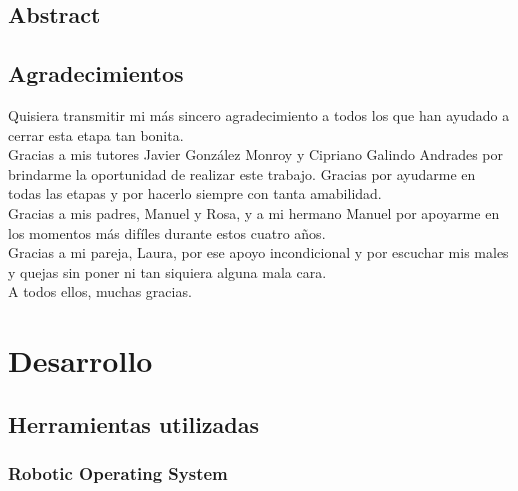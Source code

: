 \chapter*{Abstract}

\chapter*{Agradecimientos}

Quisiera transmitir mi más sincero agradecimiento a todos los que han ayudado a cerrar esta etapa tan bonita.\\

Gracias a mis tutores Javier González Monroy y Cipriano Galindo Andrades por brindarme la oportunidad de realizar este trabajo. Gracias por ayudarme en todas las etapas y por hacerlo siempre con tanta amabilidad.\\

Gracias a mis padres, Manuel y Rosa, y a mi hermano Manuel por apoyarme en los momentos más difíles durante estos cuatro años.\\

Gracias a mi pareja, Laura, por ese apoyo incondicional y por escuchar mis males y quejas sin poner ni tan siquiera alguna mala cara.\\

A todos ellos, muchas gracias.\\

\tableofcontents

\cleardoublepage
{} %
\listoffigures %

\cleardoublepage
{} %
\listoftables %



\part{Desarrollo}

\chapter{Herramientas utilizadas}

\section{Robotic Operating System}

